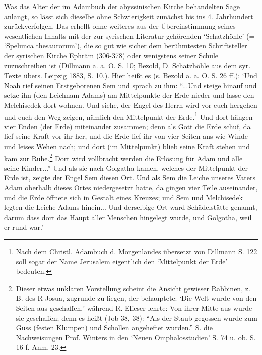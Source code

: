 \documentclass[a4paper, 11pt, oneside]{article}
\begin{document}
Was das Alter der im Adambuch der abyssinischen Kirche behandelten Sage anlangt, so lässt sich dieselbe ohne Schwierigkeit zunächst bis ins 4. Jahrhundert zurückverfolgen. Das erhellt ohne weiteres aus der Übereinstimmung seines wesentlichen Inhalts mit der zur syrischen Literatur gehörenden `Schatzhöhle' (= `Spelunca thesaurorum'), die so gut wie sicher dem berühmtesten Schriftsteller der syrischen Kirche Ephräm (306-378) oder wenigstens seiner Schule zuzuschreiben ist (Dillmann a. a. O. S. 10; Bezold, D. Schatzhöhle aus dem syr. Texte übers. Leipzig 1883, S. 10.). Hier heißt es (s. Bezold a. a. O. S. 26 ff.): `Und Noah rief seinen Erstgeborenen Sem und sprach zu ihm: "`...Und steige hinauf und setze ihn (den Leichnam Adams) am Mittelpunkte der Erde nieder und lasse den Melchisedek dort wohnen. Und siehe, der Engel des Herrn wird vor euch hergehen und euch den Weg zeigen, nämlich den Mittelpunkt der Erde.\footnote{Nach dem Christl. Adambuch d. Morgenlandes übersetzt von Dillmann S. 122 soll sogar der Name Jerusalem eigentlich den `Mittelpunkt der Erde' bedeuten.} Und dort hängen vier Enden (der Erde) miteinander zusammen; denn als Gott die Erde schuf, da lief seine Kraft vor ihr her, und die Erde lief ihr von vier Seiten ans wie Winde und leises Wehen nach; und dort (im Mittelpunkt) blieb seine Kraft stehen und kam zur Ruhe.\footnote{Dieser etwas unklaren Vorstellung scheint die Ansicht gewisser Rabbinen, z. B. des R Josua, zugrunde zu liegen, der behauptete: `Die Welt wurde von den Seiten aus geschaffen,' während R. Elieser lehrte: Von ihrer Mitte aus wurde sie geschaffen; denn es heißt (Job 38, 38): "`Als der Staub gegossen wurde zum Guss (festen Klumpen) und Schollen angeheftet wurden."' S. die Nachweisungen Prof. Winters in den `Neuen Omphalosstudien' S. 74 u. ob. S. 16 f. Anm. 23.} Dort wird vollbracht werden die Erlösung für Adam und alle seine Kinder..."' Und als sie nach Golgatha kamen, welches der Mittelpunkt der Erde ist, zeigte der Engel Sem diesen Ort. Und als Sem die Leiche unseres Vaters Adam oberhalb dieses Ortes niedergesetzt hatte, da gingen vier Teile auseinander, und die Erde öffnete sich in Gestalt eines Kreuzes; und Sem und Melchisedek legten die Leiche Adams hinein... Und derselbige Ort ward Schädelstätte genannt, darum dass dort das Haupt aller Menschen hingelegt wurde, und Golgotha, weil er rund war.'
\end{document}
